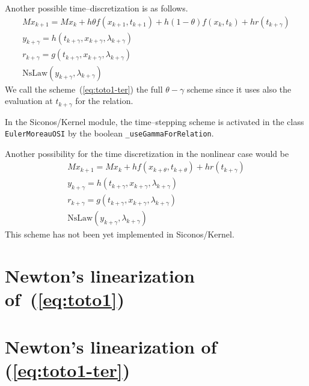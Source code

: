 Another possible time--discretization is as follows.
\begin{equation}
  \begin{array}{l}
    \label{eq:toto1-ter}
    M x_{k+1} = M x_{k} + h\theta f(x_{k+1},t_{k+1})+h(1-\theta) f(x_k,t_k) + h r(t_{k+\gamma}) \\[2mm]
    y_{k+\gamma} = h(t_{k+\gamma},x_{k+\gamma},\lambda _{k+\gamma}) \\[2mm]
    r_{k+\gamma} = g(t_{k+\gamma},x_{k+\gamma},\lambda _{k+\gamma})\\[2mm]
    \mbox{NsLaw} ( y_{k+\gamma} , \lambda_{k+\gamma})
  \end{array}
\end{equation}
We call the scheme~(\ref{eq:toto1-ter}) the full $\theta-\gamma$ scheme since it uses also the evaluation at $t_{k+\gamma}$ for the relation.

In the Siconos/Kernel module, the time--stepping scheme is activated in the class {\tt EulerMoreauOSI} by the boolean {\tt \_useGammaForRelation}.


Another possibility for the time discretization in the nonlinear case would be
\begin{equation}
  \begin{array}{l}
    \label{eq:toto1-quat}
    M x_{k+1} = M x_{k} +h f(x_{k+\theta},t_{k+\theta}) + h r(t_{k+\gamma}) \\[2mm]
    y_{k+\gamma} =  h(t_{k+\gamma},x_{k+\gamma},\lambda _{k+\gamma}) \\[2mm]
    r_{k+\gamma} = g(t_{k+\gamma},x_{k+\gamma},\lambda _{k+\gamma})\\[2mm]
    \mbox{NsLaw} ( y_{k+\gamma} , \lambda_{k+\gamma})
  \end{array}
\end{equation}
This scheme has not been yet implemented in Siconos/Kernel.

\clearpage
\section{Newton's linearization of~(\ref{eq:toto1})} 





\section{Newton's linearization of~ (\ref{eq:toto1-ter}) }



